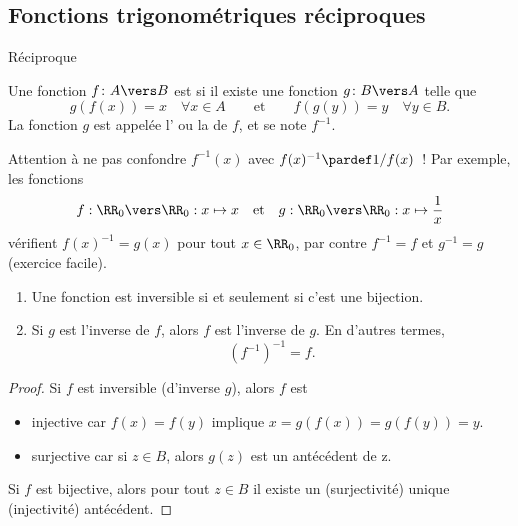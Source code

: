 \documentclass[french,xcolor=svgnames]{beamer}
\begin{document}
\subsection{Fonctions trigonométriques réciproques}
\begin{frame}{Réciproque}
  \begin{definition}
    Une fonction $f\colon A \vers B$ est  si il existe une fonction $g\colon B \vers A$ telle que
    \begin{equation*}
      g(f(x)) = x\quad \forall x \in A \qquad\text{et}\qquad f(g(y)) = y \quad\forall y  \in B.
    \end{equation*}
    La fonction $g$ est appelée l' ou la  de $f$, et se note $f^{-1}$.
  \end{definition}\pause

\begin{remark*}
  Attention à ne pas confondre $f^{-1} (x)$ avec $f(x)^{-1} \pardef 1/f(x)$~! Par exemple, les fonctions
  \begin{equation*}
    f : \RR_0 \vers \RR_0 : x\mapsto x \quad\text{et}\quad g : \RR_0 \vers
    \RR_0 : x \mapsto \frac1x
  \end{equation*}
  vérifient $f(x)^{-1} = g(x)$ pour tout $x \in \RR_0$, par contre
  $f^{-1} = f$ et $g^{-1} = g$ (exercice facile).
\end{remark*}
\end{frame}
\begin{frame}
\begin{proposition}
  \begin{enumerate}
  \item Une fonction est inversible si et seulement si c'est une bijection.
  \item Si $g$ est l'inverse de $f$, alors $f$ est l'inverse de $g$. En d'autres termes,
    \begin{equation*}
      {\left(f^{-1}\right)}^{-1} = f.
    \end{equation*}
  \end{enumerate}
\end{proposition}
\begin{proof}
  Si \(f\) est inversible (d'inverse \(g\))\pause, alors \(f\) est
  \begin{itemize}[<+->]
  \item injective car \(f(x) = f(y)\) implique \(x = g(f(x)) = g(f(y)) = y\).
  \item surjective car si \(z \in B\), alors \(g(z)\) est un antécédent de z.
  \end{itemize}\pause
  Si \(f\) est bijective, alors pour tout \(z\in B\) il existe un (surjectivité) unique (injectivité) antécédent.
\end{proof}
\end{frame}
\end{document}
